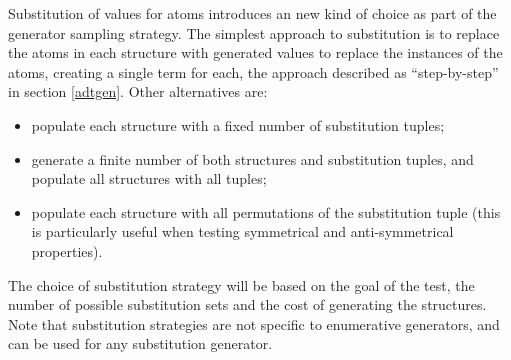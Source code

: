 Substitution of values for atoms introduces an new kind of choice 
as part of the generator sampling strategy.
The simplest approach to substitution is to 
replace the atoms in each structure with generated values
to replace the instances of the atoms, creating a single term for each,
the approach described as ``step-by-step'' in section \ref{adtgen}.
Other alternatives are:
\begin{itemize}
\item populate each structure with a fixed number of substitution tuples;
\item generate a finite number of both structures and substitution tuples, 
and populate all structures with all tuples;
\item populate each structure with all permutations of the substitution tuple
(this is particularly useful when testing symmetrical and anti-symmetrical properties).
\end{itemize}
The choice of substitution strategy will be based on 
the goal of the test,
the number of possible substitution sets and
the cost of generating the structures.
Note that substitution strategies are not specific to enumerative generators,
and can be used for any substitution generator.

